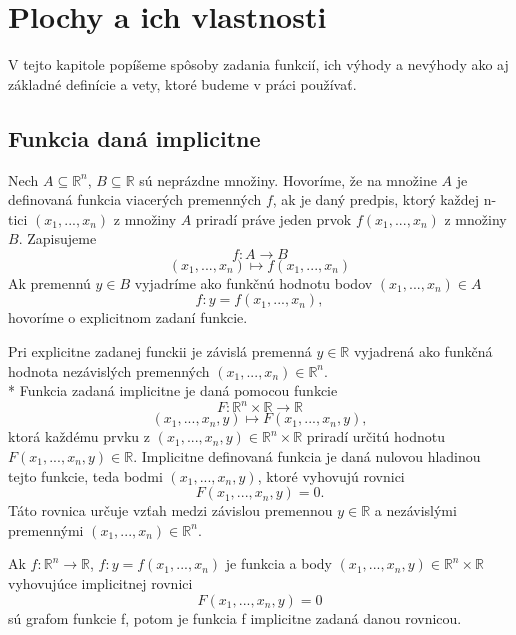 \chapter{Plochy a ich vlastnosti}

\label{kap:plochy} %

V tejto kapitole popíšeme spôsoby zadania funkcií, ich výhody a nevýhody
ako aj základné definície a vety, ktoré budeme v práci používať.

\section{Funkcia daná implicitne}

\begin{definition}
    Nech $A \subseteq \mathbb{R}^n$, $B \subseteq \mathbb{R}$ sú neprázdne množiny. 
Hovoríme, že na množine $A$ je definovaná funkcia viacerých premenných
$f$, ak je daný predpis, ktorý každej n-tici $(x_1, . . . , x_n)$
z množiny $A$ priradí práve jeden prvok $f(x_1, . . . , x_n)$ z množiny $B$.
Zapisujeme 
$$f : A \to B$$
$$(x_1, . . . , x_n) \mapsto f(x_1, . . . , x_n)$$
Ak premennú $y \in B$ vyjadríme ako funkčnú hodnotu bodov $(x_1, . . . , x_n) \in A$
$$f : y = f(x_1, . . . , x_n),$$
hovoríme o explicitnom zadaní funkcie.
\end{definition}


Pri explicitne zadanej funckii je závislá premenná $y \in \mathbb{R}$ vyjadrená ako funkčná hodnota nezávislých
premenných $(x_1, . . . , x_n)\in\mathbb{R}^n$.
\\*
Funkcia zadaná implicitne je daná pomocou funkcie $$F : \mathbb{R}^n \times \mathbb{R} \to \mathbb{R}$$
$$(x_1, . . . ,x_n, y) \mapsto F(x_1, . . . , x_n, y),$$ ktorá každému prvku z $(x_1, . . . ,x_n, y) \in \mathbb{R}^{n} \times \mathbb{R}$ 
priradí určitú hodnotu \mbox{$F(x_1, . . . , x_n, y) \in \mathbb{R}$.}
Implicitne definovaná funkcia je daná nulovou hladinou tejto funkcie, teda bodmi $(x_1, . . . , x_n, y)$, 
ktoré vyhovujú rovnici $$F(x_1, . . . , x_n, y) = 0.$$  
Táto rovnica určuje vzťah medzi závislou premennou $y \in \mathbb{R}$
a nezávislými premennými $(x_1, . . . , x_n) \in \mathbb{R}^n$. 

\begin{note}
    Ak $f : \mathbb{R}^n \to \mathbb{R}$, $f: y = f(x_1, . . . , x_n)$ je funkcia a body
    $(x_1, . . . , x_n, y) \in \mathbb{R}^n \times \mathbb{R}$ vyhovujúce implicitnej rovnici 
    $$F(x_1, . . . , x_n, y) = 0$$
    sú grafom funkcie f,
    potom je funkcia f implicitne zadaná danou rovnicou.
\end{note}

